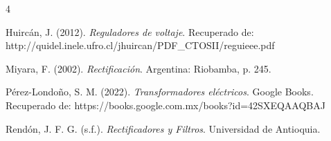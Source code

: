 \documentclass[pdflatex,sn-mathphys-num]{sn-jnl}%
\begin{document}
\begin{thebibliography}{4}

Huirc\'{a}n, J. (2012). \textit{Reguladores de voltaje}. Recuperado de: http://quidel.inele.ufro.cl/jhuircan/PDF\_CTOSII/reguieee.pdf

Miyara, F. (2002). \textit{Rectificaci\'{o}n}. Argentina: Riobamba, p. 245.

P\'{e}rez-Londo\~{n}o, S. M. (2022). \textit{Transformadores el\'{e}ctricos}. Google Books. Recuperado de: https://books.google.com.mx/books?id=42SXEQAAQBAJ

Rend\'{o}n, J. F. G. (s.f.). \textit{Rectificadores y Filtros}. Universidad de Antioquia.

\end{thebibliography}
\end{document}

